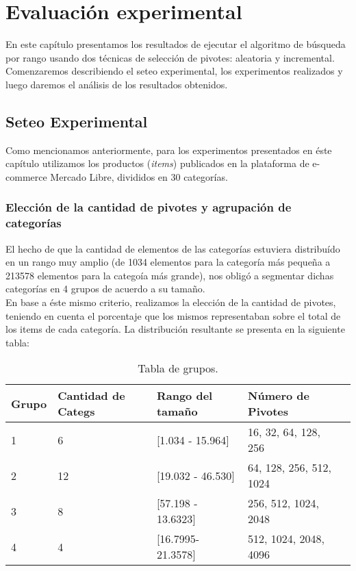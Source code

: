 \chapter{Evaluaci\'on experimental}

En este cap\'itulo presentamos los resultados de ejecutar el algoritmo de b\'usqueda por rango usando dos t\'ecnicas de selecci\'on de pivotes: aleatoria y incremental.\\

Comenzaremos describiendo el seteo experimental, los experimentos realizados y luego daremos el an\'alisis de los resultados obtenidos.\\

\section{Seteo Experimental}

Como mencionamos anteriormente, para los experimentos presentados en \'este cap\'itulo utilizamos los productos (\textit{items}) publicados en la plataforma de e-commerce Mercado Libre, divididos en 30 categor\'ias.\\

\subsection{Elecci\'on de la cantidad de pivotes y agrupaci\'on de categor\'ias}
El hecho de que la cantidad de elementos de las categor\'ias estuviera distribu\'ido en un rango muy amplio (de 1034 elementos para la categor\'ia m\'as peque\~na a 213578 elementos para la catego\'ia m\'as grande), nos oblig\'o a segmentar dichas categor\'ias en 4 grupos de acuerdo a su tamaño.\\

En base a \'este mismo criterio, realizamos la elecci\'on de la cantidad de pivotes, teniendo en cuenta el porcentaje que los mismos representaban sobre el total de los items de cada categor\'ia. La distribuci\'on resultante se presenta en la siguiente tabla:\\

\begin{table}[htbp]
\begin{center}
\begin{tabular}{|p{1.1cm}|p{1.8cm}|p{3.2cm}|p{2.2cm}|p{2.5cm}|}
\hline
Grupo & 
Cantidad de Categs & 
Rango del tama\~no & 
N\'umero de Pivotes \\
\hline \hline
1 & 
6 & 
[1.034 - 15.964] & 
16, 32, 64, 128, 256  \\ \hline
2 &
12 &
[19.032 - 46.530] &
64, 128, 256, 512, 1024  \\ \hline
3 &
8 &
[57.198 - 13.6323] &
256, 512, 1024, 2048  \\ \hline
4 &
4 &
[16.7995- 21.3578] &
512, 1024, 2048, 4096  \\ \hline
\end{tabular}
\caption{Tabla de grupos.}
\label{tabla:grupos}
\end{center}
\end{table}



